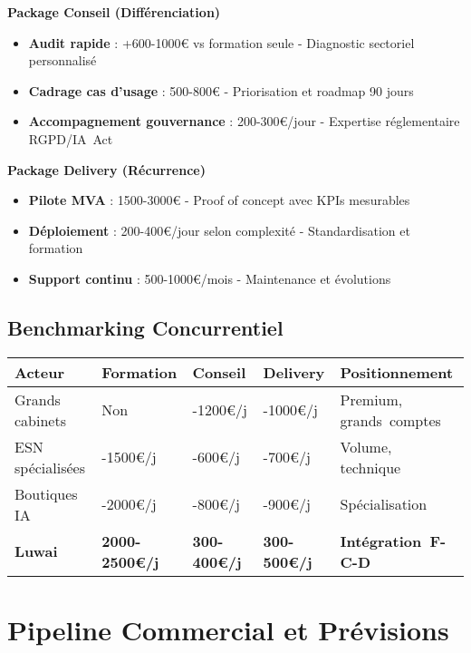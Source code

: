 \textbf{Package Conseil (Différenciation)}
\begin{itemize}
    \item \textbf{Audit rapide} : +600-1000€ vs formation seule - Diagnostic sectoriel personnalisé
    \item \textbf{Cadrage cas d'usage} : 500-800€ - Priorisation et roadmap 90 jours
    \item \textbf{Accompagnement gouvernance} : 200-300€/jour - Expertise réglementaire RGPD/IA~Act
\end{itemize}

\textbf{Package Delivery (Récurrence)}
\begin{itemize}
    \item \textbf{Pilote MVA} : 1500-3000€ - Proof of concept avec KPIs mesurables
    \item \textbf{Déploiement} : 200-400€/jour selon complexité - Standardisation et formation
    \item \textbf{Support continu} : 500-1000€/mois - Maintenance et évolutions
\end{itemize}

\subsection{Benchmarking Concurrentiel}

\begin{longtable}{@{}>{\raggedright\arraybackslash}p{3.5cm}>{\raggedright\arraybackslash}p{2.8cm}>{\raggedright\arraybackslash}p{2.8cm}>{\raggedright\arraybackslash}p{2.8cm}>{\raggedright\arraybackslash}p{3.5cm}@{}}
\toprule
\textbf{Acteur} & \textbf{Formation} & \textbf{Conseil} & \textbf{Delivery} & \textbf{Positionnement} \\
\midrule
Grands cabinets & Non & 800-1200€/j & 600-1000€/j & Premium, grands~comptes \\
ESN spécialisées & 1000-1500€/j & 400-600€/j & 400-700€/j & Volume, technique \\
Boutiques IA & 1500-2000€/j & 500-800€/j & 500-900€/j & Spécialisation \\
\textbf{Luwai} & \textbf{2000-2500€/j} & \textbf{300-400€/j} & \textbf{300-500€/j} & \textbf{Intégration~F-C-D} \\
\bottomrule
\end{longtable}

\section{Pipeline Commercial et Prévisions}

